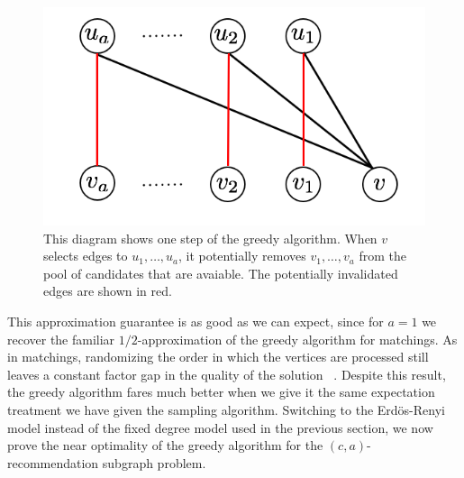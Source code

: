 \begin{figure}[H]
\centering
\includegraphics[width=.39\textwidth]{images/greedy.png}
\caption{This diagram shows one step of the greedy algorithm. When $v$ selects edges to $u_1,\ldots, u_a$, it potentially removes $v_1,\ldots, v_a$ from the pool of candidates that are avaiable. The potentially invalidated edges are shown in red.}
\end{figure} 

This approximation guarantee is as good as we can expect, 
since for $a=1$ we recover the familiar $1/2$-approximation
of the greedy algorithm for matchings. As in matchings,
randomizing the order in which the vertices are processed still
leaves a constant factor gap in the quality of the solution
~\cite{KarpVaziraniVazirani1990}. Despite this result, the greedy
algorithm fares much better when we give it the same expectation
treatment we have given the sampling algorithm. Switching to the
Erd\"{o}s-Renyi model instead of the fixed degree model used in
the previous section, we now prove the near optimality of the
greedy algorithm for the $(c, a)$-recommendation subgraph problem.

